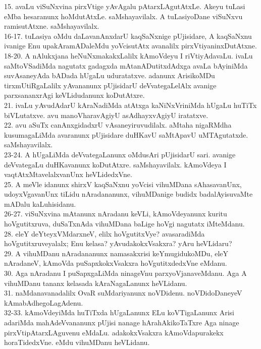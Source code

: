 \documentclass{article}
\begin{document}
15. avaLu viSuNxvina pirxVtige yAvAgalu pAtarxLAgutAtxLe. Akeyu tuLasi eMba hesaranunx hoMdutAtxLe. saMshayavilalx. A tuLasiyoDane viSuNxvu ramisutAtxne. saMshayavilalx.\\
16-17. tuLasiya oMdu daLavanAnxdarU kaqSaNxnige pUjisidare, A kaqSaNxnu ivanige Enu upakAramADaleMdu yoVcisutAtx avanalilx pirxVtiyaninxDutAtxne.\\
18-20. A nAlukxjana heNuNxmakakxLalilx kAmoVdeyu I riVtiyAdavaLu. ivaLu saMtoVSadiMda nagutatx gadagxda mAtanADutitxdAdxga avaLa bAyiniMda suvAsaneyAda bADada hUgaLu uduratatxve. adanunx ArisikoMDu tirxmUtiRgaLalilx yAvananunx pUjisidarU deVvategaLelAlx avanige parxsananxrAgi keVLidudanunx koDutAtxre.\\
21. ivaLu yAvudAdarU kAraNadiMda atAtxga kaNiNxVriniMda hUgaLu huTiTx biVLutatxve. avu manoVharavAgiyU asAdhayxvAgiyU iratatxve.\\
22. avu aSuTx canAnxgidadxrU vAsaneyiruvudilalx. aMtaha nigaRMdha kusumagaLiMda avaranunx pUjisidare duHKavU saMtApavU uMTAgutatxde. saMshayavilalx.\\
23-24. A hUgaLiMda deVvategaLanunx oMdusAri pUjisidarU sari. avanige deVvategaLu duHKavanunx koDutAtxre. saMshayavilalx. kAmoVdeya I vaqtAtxMtavelalxvanUnx heVLidedxVne.\\
25. A meVle idanunx shirxV kaqSaNxnu yoVcisi vihuMDana sAhasavanUnx, udoyxVgavanUnx tiLidu nAradananunx, vihuMDanige budidx badalAyisuvaMte mADalu kaLuhisidanu.\\
26-27. viSuNxvina mAtanunx nAradanu keVLi, kAmoVdeyanunx kuritu hoVgutitxruva, duSaTxnAda vihuMDana baLige hoVgi nagutatx iMteMdanu.\\
28. eleY deYteyxVMdarxneV, elilx hoVgutitxVye? avasaradiMda hoVgutitxruveyalalx; Enu kelasa? yAvudakokxVsakxra? yAru heVLidaru?\\
29. A vihuMDanu nAradananunx namasakxrisi keYmugidukoMDu, eleY nAradaneV, kAmoVda puSapxkokxVsakxra hoVgutitxdedxVne eMdanu.\\
30. Aga nAradanu I puSapxgaLiMda ninageVnu parxyoVjanaveMdanu. Aga A vihuMDanu tananx kelasada kAraNagaLanunx heVLidanu.\\
31. naMdanavanadalilx OvaR suMdariyanunx noVDidenu. noVDidoDaneyeV kAmabAdhegoLagAdenu.\\
32-33. kAmoVdeyiMda huTiTxda hUgaLanunx ELu koVTigaLanunx Arisi adariMda mahAdeVvananunx pUjisi nanage hArahAkikoTaTxre Aga ninage pirxVtipAtarxLAguvenu eMdaLu. adakokxVsakxra kAmoVdapurakekx horaTidedxVne. eMdu vihuMDanu heVLidanu.\\
\end{document}
